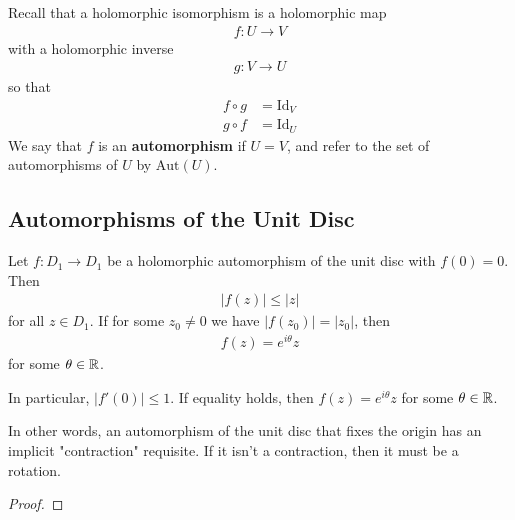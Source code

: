\documentclass{memoir}
\begin{document}


Recall that a holomorphic isomorphism is a holomorphic map
\begin{align*}
	f:U\to V
\end{align*}
with a holomorphic inverse
\begin{align*}
	g:V\to U
\end{align*}
so that
\begin{align*}
	f\circ g &= \textrm{Id}_V\\
	g\circ f &= \textrm{Id}_U
\end{align*}
We say that \(f\) is an \textbf{automorphism} if \(U=V\), and refer to the set of automorphisms of \(U\) by \(\textrm{Aut}(U)\).

\subsection{Automorphisms of the Unit Disc}
\label{sub:automorphisms_of_the_unit_disc}

\begin{thm}
	Let \(f:D_1 \to D_1\) be a holomorphic automorphism of the unit disc with \(f(0) = 0\). Then
	\begin{align*}
		\left| f(z) \right| \leq \left| z \right| 
	\end{align*}
	for all \(z \in D_1\). If for some \(z_0\neq 0\) we have \(\left| f(z_0) \right| = \left| z_0 \right| \), then
	\begin{align*}
		f(z) = e^{i \theta } z
	\end{align*}
	for some \(\theta \in \mathbb{R}\).

	In particular, \(\left| f'(0) \right| \leq 1\). If equality holds, then \(f(z) = e^{i\theta } z\) for some \(\theta \in \mathbb{R}\).
\end{thm}
In other words, an automorphism of the unit disc that fixes the origin has an implicit "contraction" requisite. If it isn't a contraction, then it must be a rotation.

\begin{proof}
	
\end{proof}%
\end{document}
